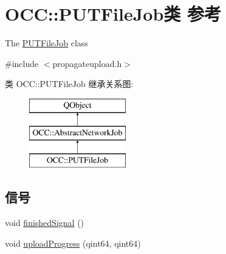 \hypertarget{class_o_c_c_1_1_p_u_t_file_job}{}\section{O\+CC\+:\+:P\+U\+T\+File\+Job类 参考}
\label{class_o_c_c_1_1_p_u_t_file_job}


The \hyperlink{class_o_c_c_1_1_p_u_t_file_job}{P\+U\+T\+File\+Job} class  




{\ttfamily \#include $<$propagateupload.\+h$>$}

类 O\+CC\+:\+:P\+U\+T\+File\+Job 继承关系图\+:\begin{figure}[H]
\begin{center}
\leavevmode
\includegraphics[height=3.000000cm]{class_o_c_c_1_1_p_u_t_file_job}
\end{center}
\end{figure}
\subsection*{信号}
\begin{DoxyCompactItemize}
\item 
void \hyperlink{class_o_c_c_1_1_p_u_t_file_job_a71169802aa933c6f49b7d6695136f330}{finished\+Signal} ()
\item 
void \hyperlink{class_o_c_c_1_1_p_u_t_file_job_aa8f37f698b1f76e4a3e127eda5f097c2}{upload\+Progress} (qint64, qint64)
\end{DoxyCompactItemize}
